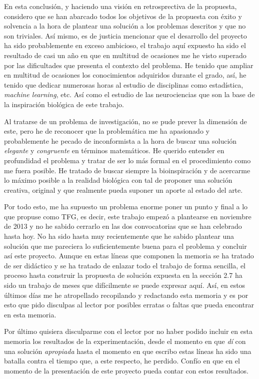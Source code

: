 \documentclass[10pt,a4paper]{report}
\begin{document}
En esta conclusión, y haciendo una visión en retrosprectiva de la propuesta, considero que se han abarcado todos los objetivos de la propuesta con éxito y solvencia a la hora de plantear una solución a los problemas descritos y que no son triviales. Así mismo, es de justicia mencionar que el desarrollo del proyecto ha sido probablemente en exceso ambicioso, el trabajo aquí expuesto ha sido el resultado de casi un año en que en multitud de ocasiones me he visto superado por las dificultades que presenta el contexto del problema. He tenido que ampliar en multitud de ocasiones los conocimientos adquiridos durante el grado, así, he tenido que dedicar numerosas horas al estudio de disciplinas como estadística, \textit{machine learning}, etc. Así como el estudio de las neurociencias que son la base de la inspiración biológica de este trabajo.

Al tratarse de un problema de investigación, no se pude prever la dimensión de este, pero he de reconocer que la problemática me ha apasionado y probablemente he pecado de inconformista a la hora de buscar una solución \textit{elegante} y \textit{congruente} en términos matemáticos. He querido entender en profundidad el problema y tratar de ser lo más formal en el procedimiento como me fuera posible. He tratado de buscar siempre la bioinspiración y de acercarme lo máximo posible a la realidad biológica con tal de proponer una solución creativa, original y que realmente pueda suponer un aporte al estado del arte.

Por todo esto, me ha supuesto un problema enorme poner un punto y final a lo que propuse como TFG, es decir, este trabajo empezó a plantearse en noviembre de 2013 y no he sabido cerrarlo en las dos convocatorias que se han celebrado hasta hoy. No ha sido hasta muy recientemente que he sabido plantear una solución que me pareciera lo suficientemente buena para el problema y concluir así este proyecto. Aunque en estas líneas que componen la memoria se ha tratado de ser didáctico y se ha tratado de enlazar todo el trabajo de forma sencilla, el proceso hasta construir la propuesta de solución expuesta en la sección 2.7 ha sido un trabajo de meses que difícilmente se puede expresar aquí. Así, en estos últimos días me he atropellado recopilando y redactando esta memoria y es por esto que pido disculpas al lector por posibles erratas o faltas que pueda encontrar en esta memoria.

Por último quisiera disculparme con el lector por no haber podido incluir en esta memoria los resultados de la experimentación, desde el momento en que \textit{dí} con una solución \textit{apropiada} hasta el momento en que escribo estas líneas ha sido una batalla contra el tiempo que, a este respecto, he perdido. Confío en que en el momento de la presentación de este proyecto pueda contar con estos resultados.




\end{document}
